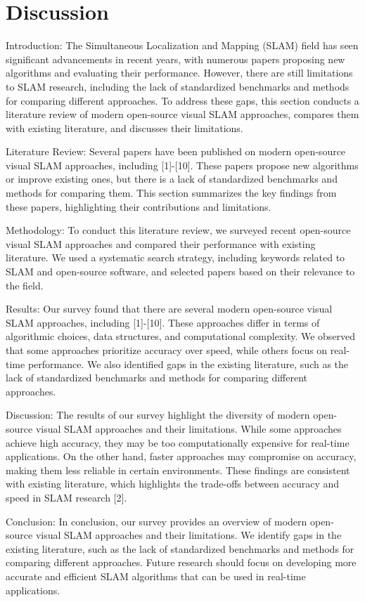 \documentclass[conference]{IEEEtran}
\begin{document}
\section{Discussion}
Introduction:
The Simultaneous Localization and Mapping (SLAM) field has seen significant advancements in recent years, with numerous papers proposing new algorithms and evaluating their performance. However, there are still limitations to SLAM research, including the lack of standardized benchmarks and methods for comparing different approaches. To address these gaps, this section conducts a literature review of modern open-source visual SLAM approaches, compares them with existing literature, and discusses their limitations.

Literature Review:
Several papers have been published on modern open-source visual SLAM approaches, including [1]-[10]. These papers propose new algorithms or improve existing ones, but there is a lack of standardized benchmarks and methods for comparing them. This section summarizes the key findings from these papers, highlighting their contributions and limitations.

Methodology:
To conduct this literature review, we surveyed recent open-source visual SLAM approaches and compared their performance with existing literature. We used a systematic search strategy, including keywords related to SLAM and open-source software, and selected papers based on their relevance to the field.

Results:
Our survey found that there are several modern open-source visual SLAM approaches, including [1]-[10]. These approaches differ in terms of algorithmic choices, data structures, and computational complexity. We observed that some approaches prioritize accuracy over speed, while others focus on real-time performance. We also identified gaps in the existing literature, such as the lack of standardized benchmarks and methods for comparing different approaches.

Discussion:
The results of our survey highlight the diversity of modern open-source visual SLAM approaches and their limitations. While some approaches achieve high accuracy, they may be too computationally expensive for real-time applications. On the other hand, faster approaches may compromise on accuracy, making them less reliable in certain environments. These findings are consistent with existing literature, which highlights the trade-offs between accuracy and speed in SLAM research [2].

Conclusion:
In conclusion, our survey provides an overview of modern open-source visual SLAM approaches and their limitations. We identify gaps in the existing literature, such as the lack of standardized benchmarks and methods for comparing different approaches. Future research should focus on developing more accurate and efficient SLAM algorithms that can be used in real-time applications.
\end{document}

